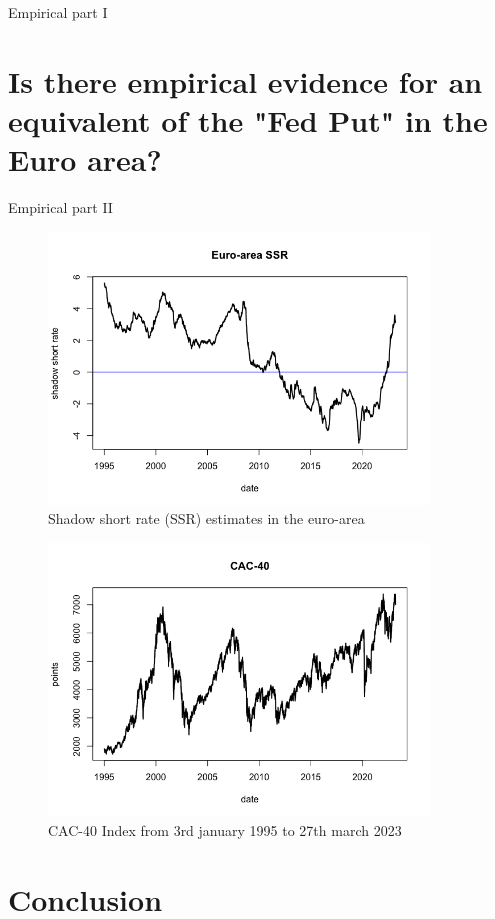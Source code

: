 Empirical part I

\chapter{Is there empirical evidence for an equivalent of the "Fed Put" in the Euro area?}

Empirical part II

\begin{figure}[h]
    \centering
    \includegraphics[width=0.9\textwidth]{figures/plot_shadow_short_rate_euro_area}
    \caption{Shadow short rate (SSR) estimates in the euro-area}
\end{figure}

\begin{figure}[h]
    \centering
    \includegraphics[width=0.9\textwidth]{figures/cac-40}
    \caption{CAC-40 Index from 3rd january 1995 to 27th march 2023}
\end{figure}

\chapter{Conclusion}


